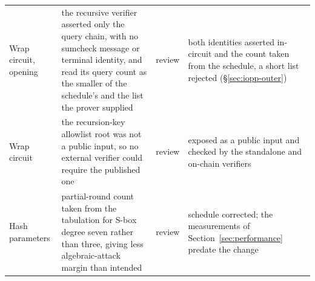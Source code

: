 \begin{table}[t]
\begin{tabular}{>{\raggedright\arraybackslash}p{} >{\raggedright\arraybackslash}p{} >{\raggedright\arraybackslash}p{} >{\raggedright\arraybackslash}p{}}
Wrap circuit, opening & the recursive \BaseFold{} verifier asserted only the query chain, with no sumcheck message or terminal identity, and read its query count as the smaller of the schedule's and the list the prover supplied & review & both identities asserted in-circuit and the count taken from the schedule, a short list rejected (\S\ref{sec:iopp-outer}) \\
Wrap circuit & the recursion-key allowlist root was not a public input, so no external verifier could require the published one & review & exposed as a public input and checked by the standalone and on-chain verifiers \\
Hash parameters & partial-round count taken from the tabulation for S-box degree seven rather than three, giving less algebraic-attack margin than intended & review & schedule corrected; the measurements of Section~\ref{sec:performance} predate the change \\
\bottomrule
\end{tabular}
\end{table}
